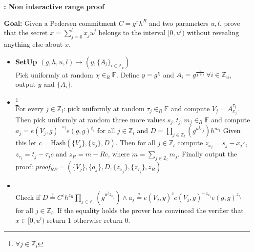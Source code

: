 \begin{algorithm}[]
\caption{\textbf{: Non interactive range proof}}
\textbf{Goal:} Given a Pedersen commitment $C=g^x h^R$ and two parameters $u,l$, prove that the secret $x=\sum_{j=0}^l x_j u^j$ belongs to the interval $[0,u^l)$ without revealing anything else about $x$.
\vspace{2pt}
\hline
\vspace{2pt}
\begin{itemize}
  \item\textbf{SetUp $(g,h,u,l)\xrightarrow[]{}(y,\{A_{i}\}_{i\in\mathds{Z}_u})$}\\
Pick uniformly at random $\chi\in_R\mathds{F}$. Define $y=g^\chi$ and $A_i=g^{\frac{1}{\chi+i}} \: \forall i\in\mathds{Z}_u$, output $y$ and $\{A_i\}$.

\item{}\footnote{$\forall j\in\mathds{Z}_l$}\\
 For every $j\in\mathds{Z}_l$: pick uniformly at random $\tau_j\in_R\mathds{F}$ and compute $V_j=A_{x_j}^{\tau_j}$. Then pick uniformly at random three more values $s_j,t_j,m_j\in_R\mathds{F}$ and compute $a_j=e(V_j,g)^{-s_j}e(g,g)^{t_j}$ for all $j\in\mathds{Z}_l$ and $D=\prod_{j\in\mathds{Z}_l}(g^{u^js_j})h^{m_j}$ Given this let $c=\text{Hash}(\{V_j\},\{a_j\},D)$. Then for all $j\in\mathds{Z}_l$ compute $z_{x_j}=s_j-x_jc$,$z_{\tau_j}=t_j-\tau_jc$ and $z_R=m-Rc$, where $m=\sum_{j\in\mathds{Z}_l}m_j$. Finally output the proof: \textit{proof}$_{RP}=(\{V_j\},\{a_j\},D,\{z_{x_j}\},\{z_{\tau_j}\},z_R)$ 

\item{}\\
Check if $D\overset{?}{=}C^ch^{z_R}\prod_{j\in\mathds{Z}_l}(g^{u^j z_{x_j}})\wedge a_j \overset{?}{=} e(V_j,y)^c e(V_j,g)^{-z_{x_j}}e(g,g)^{z_{\tau_j}}$ for all $j\in\mathds{Z}_l$.  If the equality holds the prover has convinced the verifier that $x\in [0,u^l)$ return $1$ otherwise return $0$.
\end{itemize}
\label{alg:ZKRP}
\end{algorithm}

